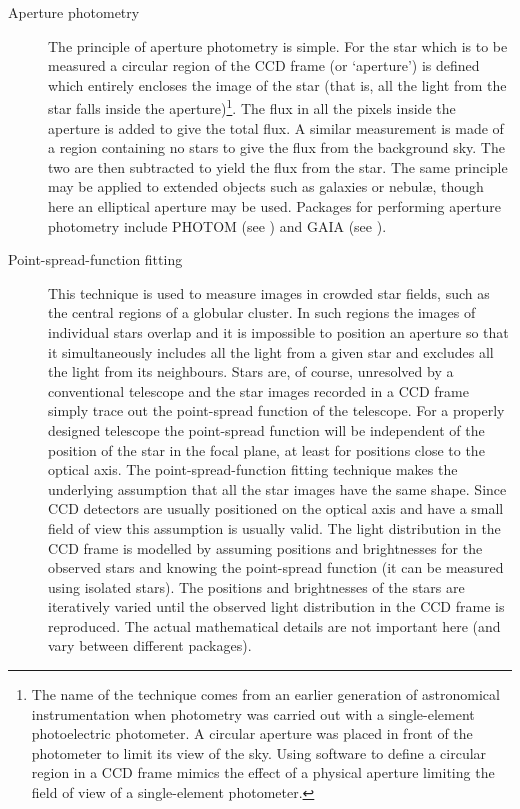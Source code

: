 \documentclass[twoside,11pt,nolof]{starlink}
\begin{document}
\begin{description}

  \item[Aperture photometry] The principle of aperture photometry is
   simple.  For the star which is to be measured a circular region
   of the CCD frame (or `aperture') is defined which entirely encloses
   the image of the star (that is, all the light from the star falls
   inside the aperture)\footnote{The name of the technique comes from
   an earlier generation of astronomical instrumentation when photometry
   was carried out with a single-element photoelectric photometer.  A
   circular aperture was placed in front of the photometer to limit
   its view of the sky.  Using software to define a circular region
   in a CCD frame mimics the effect of a physical aperture limiting
   the field of view of a single-element photometer.}.  The flux in all
   the pixels inside the aperture is added to give the total flux.  A
   similar measurement is made of a region containing no stars to give
   the flux from the background sky.  The two are then subtracted to yield
   the flux from the star.  The same principle may be applied to extended
   objects such as galaxies or nebul\ae, though here an elliptical aperture
   may be used.  Packages for performing aperture photometry include
   PHOTOM (see \cite{SUN45}) and GAIA (see
   \cite{SUN214}).

  \item[Point-spread-function fitting] This technique is used to
   measure images in crowded star fields, such as the central regions
   of a globular cluster.  In such regions the images of individual
   stars overlap and it is impossible to position an aperture so that
   it simultaneously includes all the light from a given star and
   excludes all the light from its neighbours.  Stars are, of course,
   unresolved by a conventional telescope and the star images recorded
   in a CCD frame simply trace out the point-spread function of the
   telescope.  For a properly designed telescope the point-spread
   function will be independent of the position of the star in the
   focal plane, at least for positions close to the optical axis.
   The point-spread-function fitting technique makes the underlying
   assumption that all the star images have the same shape.  Since CCD
   detectors are usually positioned on the optical axis and have a small
   field of view this assumption is usually valid.  The light distribution
   in the CCD frame is modelled by assuming positions and brightnesses
   for the observed stars and knowing the point-spread function (it can
   be measured using isolated stars).  The positions and brightnesses of
   the stars are iteratively varied until the observed light distribution
   in the CCD frame is reproduced.  The actual mathematical details are
   not important here (and vary between different packages).


\end{description}
\end{document}
